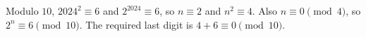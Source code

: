 Modulo $10$, $2024^2\equiv6$ and $2^{2024}\equiv6$, so $n\equiv2$ and $n^2\equiv4$. Also $n\equiv0\pmod4$, so $2^n\equiv6\pmod{10}$. The required last digit is $4+6\equiv\boxed0\pmod{10}$.
